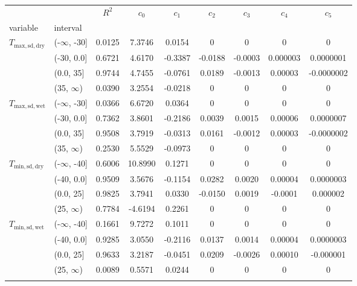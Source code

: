 \begin{tabular}{llccccccc}
\tophline
                                              &            &  $R^2$ &   $c_0$ &   $c_1$ &   $c_2$ &   $c_3$ &    $c_4$ &      $c_5$ \\
variable & interval &        &         &         &         &         &          &            \\
\middlehline
$T_{\mathrm{max}, \mathrm{sd}, \mathrm{dry}}$ & (-$\infty$, -30] & 0.0125 & 7.3746 & 0.0154 & 0 & 0 & 0 & 0 \\
                                              & (-30, 0.0] & 0.6721 & 4.6170 & -0.3387 & -0.0188 & -0.0003 & 0.000003 & 0.0000001 \\
                                              & (0.0, 35] & 0.9744 & 4.7455 & -0.0761 & 0.0189 & -0.0013 & 0.00003 & -0.0000002 \\
                                              & (35, $\infty$) & 0.0390 & 3.2554 & -0.0218 & 0 & 0 & 0 & 0 \\
$T_{\mathrm{max}, \mathrm{sd}, \mathrm{wet}}$ & (-$\infty$, -30] & 0.0366 & 6.6720 & 0.0364 & 0 & 0 & 0 & 0 \\
                                              & (-30, 0.0] & 0.7362 & 3.8601 & -0.2186 & 0.0039 & 0.0015 & 0.00006 & 0.0000007 \\
                                              & (0.0, 35] & 0.9508 & 3.7919 & -0.0313 & 0.0161 & -0.0012 & 0.00003 & -0.0000002 \\
                                              & (35, $\infty$) & 0.2530 & 5.5529 & -0.0973 & 0 & 0 & 0 & 0 \\
$T_{\mathrm{min}, \mathrm{sd}, \mathrm{dry}}$ & (-$\infty$, -40] & 0.6006 & 10.8990 & 0.1271 & 0 & 0 & 0 & 0 \\
                                              & (-40, 0.0] & 0.9509 & 3.5676 & -0.1154 & 0.0282 & 0.0020 & 0.00004 & 0.0000003 \\
                                              & (0.0, 25] & 0.9825 & 3.7941 & 0.0330 & -0.0150 & 0.0019 & -0.0001 & 0.000002 \\
                                              & (25, $\infty$) & 0.7784 & -4.6194 & 0.2261 & 0 & 0 & 0 & 0 \\
$T_{\mathrm{min}, \mathrm{sd}, \mathrm{wet}}$ & (-$\infty$, -40] & 0.1661 & 9.7272 & 0.1011 & 0 & 0 & 0 & 0 \\
                                              & (-40, 0.0] & 0.9285 & 3.0550 & -0.2116 & 0.0137 & 0.0014 & 0.00004 & 0.0000003 \\
                                              & (0.0, 25] & 0.9633 & 3.2187 & -0.0451 & 0.0209 & -0.0026 & 0.00010 & -0.000001 \\
                                              & (25, $\infty$) & 0.0089 & 0.5571 & 0.0244 & 0 & 0 & 0 & 0 \\
\bottomhline
\end{tabular}

